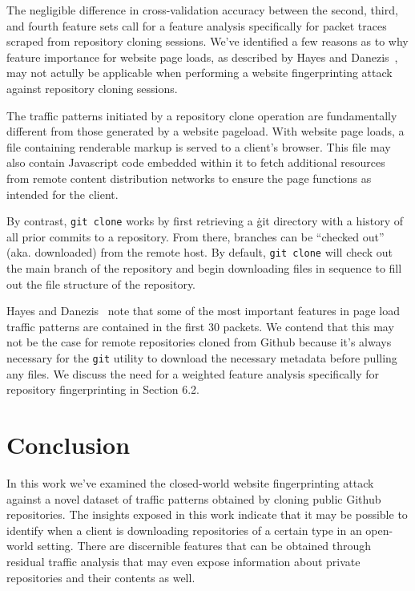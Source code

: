 \documentclass[sigconf,authorversion,nonacm]{acmart}
\begin{document}
The negligible difference in cross-validation accuracy between the second, third, and fourth feature sets call for a feature analysis specifically for packet traces scraped from repository cloning sessions. We've identified a few reasons as to why feature importance for website page loads, as described by Hayes and Danezis~\citep{hayes2016k}, may not actully be applicable when performing a website fingerprinting attack against repository cloning sessions.

The traffic patterns initiated by a repository clone operation are fundamentally different from those generated by a website pageload. With website page loads, a file containing renderable markup is served to a client's browser. This file may also contain Javascript code embedded within it to fetch additional resources from remote content distribution networks to ensure the page functions as intended for the client. 

By contrast, \texttt{git clone} works by first retrieving a \.git directory with a history of all prior commits to a repository. From there, branches can be ``checked out'' (aka. downloaded) from the remote host. By default, \texttt{git clone} will check out the main branch of the repository and begin downloading files in sequence to fill out the file structure of the repository.

Hayes and Danezis~\citep{hayes2016k} note that some of the most important features in page load traffic patterns are contained in the first 30 packets. We contend that this may not be the case for remote repositories cloned from Github because it's always necessary for the \texttt{git} utility to download the necessary metadata before pulling any files. We discuss the need for a weighted feature analysis specifically for repository fingerprinting in Section 6.2. 



\section{Conclusion}
In this work we've examined the closed-world website fingerprinting attack against a novel dataset of traffic patterns obtained by cloning public Github repositories. The insights exposed in this work indicate that it may be possible to identify when a client is downloading repositories of a certain type in an open-world setting. There are discernible features that can be obtained through residual traffic analysis that may even expose information about private repositories and their contents as well.
\end{document}

